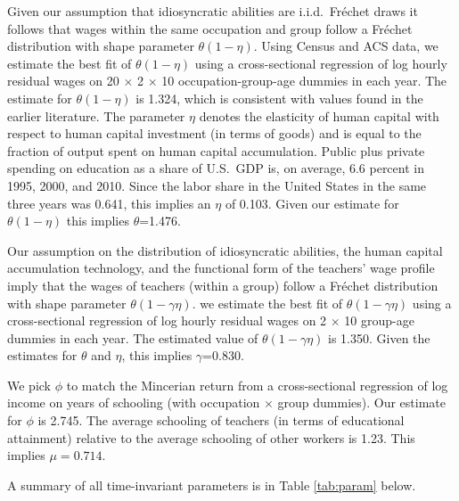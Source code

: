 \documentclass[onehalfspacing,11pt]{article}
\begin{document}
	Given our assumption that idiosyncratic abilities are i.i.d.~Fr\'echet draws it follows that wages within the same occupation and group follow a Fr\'echet distribution with shape parameter $\theta(1-\eta)$. Using Census and ACS data, we estimate the best fit of $\theta(1-\eta)$ using a cross-sectional regression of log hourly residual wages on 20 $\times$ 2 $\times$ 10 occupation-group-age dummies in each year. The estimate for $\theta(1-\eta)$ is 1.324, which is consistent with values found in the earlier literature. The parameter $\eta$ denotes the elasticity of human capital with respect to human capital investment (in terms of goods) and is equal to the fraction of output spent on human capital accumulation. Public plus private spending on education as a share of U.S.~GDP is, on average, 6.6 percent in 1995, 2000, and 2010. Since the labor share in the United States in the same three years was 0.641, this implies an $\eta$ of 0.103. Given our estimate for $\theta(1-\eta)$ this implies $\theta$=1.476.
	
	Our assumption on the distribution of idiosyncratic abilities, the human capital accumulation technology, and the functional form of the teachers' wage profile imply that the wages of teachers (within a group) follow a Fr\'echet distribution with shape parameter $\theta(1-\gamma\eta)$. we estimate the best fit of $\theta(1-\gamma\eta)$ using a cross-sectional regression of log hourly residual wages on 2 $\times$ 10 group-age dummies in each year. The estimated value of $\theta(1-\gamma\eta)$ is 1.350. Given the estimates for $\theta$ and $\eta$, this implies $\gamma$=0.830.
	
	We pick $\phi$ to match the Mincerian return from a cross-sectional regression of log income on years of schooling (with occupation $\times$ group dummies). Our estimate for $\phi$ is 2.745. The average schooling of teachers (in terms of educational attainment) relative to the average schooling of other workers is 1.23. This implies $\mu=0.714$.
	
	A summary of all time-invariant parameters is in Table \ref{tab:param} below.
	
\end{document}
